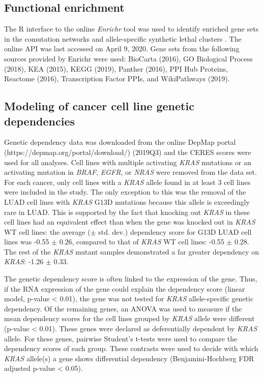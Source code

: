 \documentclass[english, 10pt, letterpaper]{article}
\newcommand{\KRAS}{\emph{KRAS}}
\begin{document}
\subsection*{Functional enrichment}
The R interface to the online \emph{Enrichr} tool was used to identify enriched gene sets in the comutation networks and allele-specific synthetic lethal clusters \cite{Chen2013, Kuleshov2016Enrichr:Update., R-enrichR}.
The online API was last accessed on April 9, 2020.
Gene sets from the following sources provided by Enrichr were used: BioCarta (2016), GO Biological Process (2018), KEA (2015), KEGG (2019), Panther (2016), PPI Hub Proteins, Reactome (2016), Transcription Factor PPIs, and WikiPathways (2019).


\subsection*{Modeling of cancer cell line genetic dependencies}
Genetic dependency data was downloaded from the online DepMap portal (https://depmap.org/portal/download/) (2019Q3) and the CERES scores were used for all analyses.
Cell lines with multiple activating \KRAS{} mutations or an activating mutation in \emph{BRAF}, \emph{EGFR}, or \emph{NRAS} were removed from the data set.
For each cancer, only cell lines with a \KRAS{} allele found in at least 3 cell lines were included in the study.
The only exception to this was the removal of the LUAD cell lines with \KRAS{} G13D mutations because this allele is exceedingly rare in LUAD.
This is supported by the fact that knocking out \KRAS{} in these cell lines had an equivalent effect than when the gene was knocked out in \KRAS{} WT cell lines: the average ($\pm$ std. dev.) dependency score for G13D LUAD cell lines was -0.55 $\pm$ 0.26, compared to that of \KRAS{} WT cell lines: -0.55 $\pm$ 0.28. The rest of the \KRAS{} mutant samples demonstrated a far greater dependency on \KRAS{}: -1.26 $\pm$ 0.33.

The genetic dependency score is often linked to the expression of the gene.
Thus, if the RNA expression of the gene could explain the dependency score (linear model, p-value < 0.01), the gene was not tested for \KRAS{} allele-specific genetic dependency.
Of the remaining genes, an ANOVA was used to measure if the mean dependency scores for the cell lines grouped by \KRAS{} allele were different (p-value < 0.01).
These genes were declared as deferentially dependent by \KRAS{} allele.
For these genes, pairwise Student's t-tests were used to compare the dependency scores of each group.
These contrasts were used to decide with which \KRAS{} allele(s) a gene shows differential dependency (Benjamini-Hochberg FDR adjusted p-value < 0.05).
\end{document}
